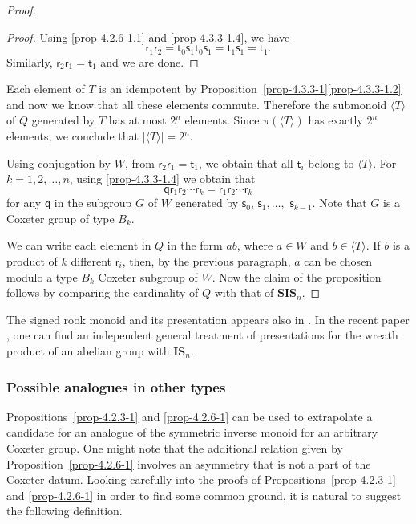 \documentclass[a4paper]{amsart}
\begin{document}
\begin{proof}
\begin{proof}
Using \eqref{prop-4.2.6-1.1} and
\eqref{prop-4.3.3-1.4}, we have
\begin{displaymath}
\mathsf{r}_1\mathsf{r}_2=\mathsf{t}_0\mathsf{s}_1\mathsf{t}_0\mathsf{s}_1
=\mathsf{t}_1\mathsf{s}_1=\mathsf{t}_1.
\end{displaymath}
Similarly, $\mathsf{r}_2\mathsf{r}_1=\mathsf{t}_1$ and we are done.
\end{proof}

Each element of $T$ is an idempotent by 
Proposition~\ref{prop-4.3.3-1}\eqref{prop-4.3.3-1.2} and now we know that all these elements commute. 
Therefore the submonoid $\langle T\rangle$ of $Q$
generated by $T$ has at most $2^n$ elements. Since $\pi(\langle T\rangle)$
has exactly $2^n$ elements, we conclude that $|\langle T\rangle|=2^n$.

Using conjugation by $W$, from $\mathsf{r}_2\mathsf{r}_1=\mathsf{t}_1$,
we obtain that all $\mathsf{t}_i$ belong to $\langle T\rangle$.
For $k=1,2,\dots,n$, using \eqref{prop-4.3.3-1.4} 
we obtain that 
\begin{displaymath}
\mathsf{q}\mathsf{r}_1\mathsf{r}_2\cdots \mathsf{r}_k=
\mathsf{r}_1\mathsf{r}_2\cdots \mathsf{r}_k
\end{displaymath}
for any $\mathsf{q}$ in the subgroup $G$ of $W$ generated
by $\mathsf{s}_0$, $\mathsf{s}_1,\dots,$ $\mathsf{s}_{k-1}$.
Note that $G$ is a Coxeter group of type $B_k$.

We can write
each element in $Q$ in the form $ab$, where $a\in W$ and $b\in \langle T\rangle$.
If $b$ is a product of $k$ different $\mathsf{r}_i$, then,
by the previous paragraph, $a$ can be chosen modulo a type $B_k$
Coxeter subgroup of $W$. Now the claim of the proposition follows
by comparing the cardinality of $Q$ with that of ${\mathbf{SIS}}_n$.
\end{proof}

The signed rook monoid and its presentation appears also in \cite{EF13}.
In the recent paper \cite{CE}, one can find an independent general
treatment of presentations for the wreath product of an abelian group
with ${\mathbf{IS}}_n$.

\subsubsection{Possible analogues in other types}\label{s4.2.7}

Propositions~\ref{prop-4.2.3-1} and \ref{prop-4.2.6-1} can be used
to extrapolate a candidate for an analogue of the symmetric inverse 
monoid for an arbitrary Coxeter group. One might note that the additional
relation given by Proposition~\ref{prop-4.2.6-1} involves an asymmetry
that is not a part of the Coxeter datum. Looking carefully into the proofs
of Propositions~\ref{prop-4.2.3-1} and \ref{prop-4.2.6-1} in order to find
some common ground, it is natural to suggest the following definition.
\end{document}
